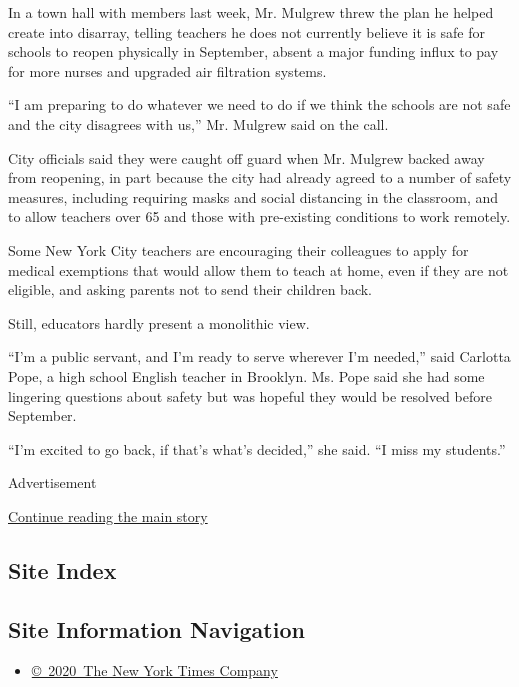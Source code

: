In a town hall with members last week, Mr. Mulgrew threw the plan he
helped create into disarray, telling teachers he does not currently
believe it is safe for schools to reopen physically in September, absent
a major funding influx to pay for more nurses and upgraded air
filtration systems.

``I am preparing to do whatever we need to do if we think the schools
are not safe and the city disagrees with us,'' Mr. Mulgrew said on the
call.

City officials said they were caught off guard when Mr. Mulgrew backed
away from reopening, in part because the city had already agreed to a
number of safety measures, including requiring masks and social
distancing in the classroom, and to allow teachers over 65 and those
with pre-existing conditions to work remotely.

Some New York City teachers are encouraging their colleagues to apply
for medical exemptions that would allow them to teach at home, even if
they are not eligible, and asking parents not to send their children
back.

Still, educators hardly present a monolithic view.

``I'm a public servant, and I'm ready to serve wherever I'm needed,''
said Carlotta Pope, a high school English teacher in Brooklyn. Ms. Pope
said she had some lingering questions about safety but was hopeful they
would be resolved before September.

``I'm excited to go back, if that's what's decided,'' she said. ``I miss
my students.''

Advertisement

\protect\hyperlink{after-bottom}{Continue reading the main story}

\hypertarget{site-index}{%
\subsection{Site Index}\label{site-index}}

\hypertarget{site-information-navigation}{%
\subsection{Site Information
Navigation}\label{site-information-navigation}}

\begin{itemize}
\tightlist
\item
  \href{https://help.nytimes3xbfgragh.onion/hc/en-us/articles/115014792127-Copyright-notice}{©~2020~The
  New York Times Company}
\end{itemize}

